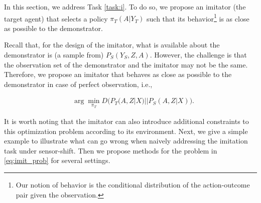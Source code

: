 \documentclass[letterpaper]{article} %
\theoremstyle{definition}%
\theoremstyle{definition}
\newcommand{\repl}[2]{\st{#1}\textcolor{red}{#2}}
\newcommand{\dob}[1]{do(#1)}
\newcommand{\Obs}{Y}
\newcommand{\obs}{y}
\newcommand{\Out}{Z}
\begin{document}
%
%



In this section, we address Task \ref{task:i}. To do so, we propose an imitator (the target agent) that selects a policy $\pi_T(A|\Obs_T)$ such that its behavior\footnote{Our notion of behavior is the conditional distribution of the action-outcome pair given the observation.} is as close as possible to the demonstrator.

Recall that, for the design of the imitator, what is available about the demonstrator is (a sample from) $P_S(\Obs_S, \Out, A)$.
However, the challenge is that the observation set of the demonstrator and the imitator may not be the same.
Therefore, we propose an imitator that behaves as close as possible to the demonstrator in case of perfect observation, i.e.,

\begin{align}\label{eq:imit_prob}
&\arg\min_{\pi_T}D\Big(P_T(A, \Out|X)||P_S(A, \Out|X)\Big).
\end{align}

It is worth noting that the imitator can also introduce additional constraints to this optimization problem according to its environment.
Next, we give a simple example to illustrate what can go wrong when naively addressing the imitation task under sensor-shift.
Then we propose methods for the problem in \eqref{eq:imit_prob} for several settings.
\end{document}
